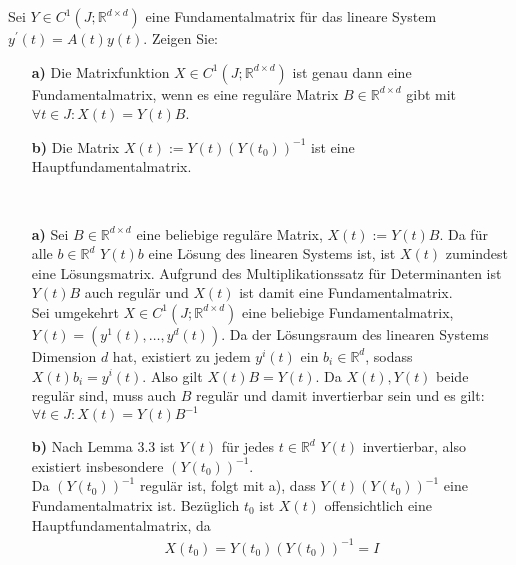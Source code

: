 \begin{exercise}
Sei $Y \in C^1(J;\mathbb{R}^{d\times d})$ eine Fundamentalmatrix für das lineare
System $y^{\prime}(t) = A(t)y(t)$. Zeigen Sie:
\begin{itemize}
  \item [\textbf{a)}] Die Matrixfunktion $X \in C^1(J;\mathbb{R}^{d \times d})$
  ist genau dann eine Fundamentalmatrix, wenn es eine reguläre Matrix
  $B \in \mathbb{R}^{d\times d}$ gibt mit $\forall t \in J: X(t) = Y(t)B$.
  \item [\textbf{b)}] Die Matrix $X(t) := Y(t)(Y(t_0))^{-1}$ ist eine
  Hauptfundamentalmatrix.
\end{itemize}
\end{exercise}
\begin{solution}
\leavevmode \\
\begin{itemize}
  \item [\textbf{a)}] Sei $B \in \mathbb{R}^{d\times d}$ eine beliebige reguläre
  Matrix, $X(t) := Y(t)B$. Da für alle $b \in \mathbb{R}^{d}$ $Y(t) b$ eine
  Lösung des linearen Systems ist, ist $X(t)$ zumindest eine Lösungsmatrix.
  Aufgrund des Multiplikationssatz für Determinanten ist $Y(t)B$ auch regulär
  und $X(t)$ ist damit eine Fundamentalmatrix. \\
  Sei umgekehrt $X \in C^1(J;\mathbb{R}^{d \times d})$ eine beliebige
  Fundamentalmatrix, $Y(t) = (y^1(t),\dots,y^d(t))$. Da der Lösungsraum des
  linearen Systems Dimension $d$ hat, existiert zu jedem $y^i(t)$ ein $b_i \in
  \mathbb{R}^d$, sodass $X(t) b_i = y^i(t)$. Also gilt $X(t)B = Y(t)$. Da
  $X(t), Y(t)$ beide regulär sind, muss auch $B$ regulär und damit invertierbar
  sein und es gilt: $\forall t \in J: X(t) = Y(t)B^{-1}$
  \item [\textbf{b)}] Nach Lemma 3.3 ist $Y(t)$ für jedes $t \in \mathbb{R}^d$
  $Y(t)$ invertierbar, also existiert insbesondere $(Y(t_0))^{-1}$. \\
  Da $(Y(t_0))^{-1}$ regulär ist, folgt mit a), dass $Y(t)(Y(t_0))^{-1}$ eine
  Fundamentalmatrix ist. Bezüglich
  $t_0$ ist $X(t)$ offensichtlich eine Hauptfundamentalmatrix, da
  \begin{align*}
    X(t_0) = Y(t_0)(Y(t_0))^{-1} = I
  \end{align*}
\end{itemize}

\end{solution}
